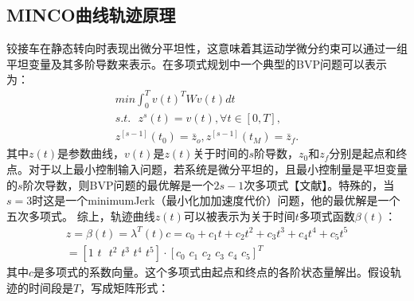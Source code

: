\documentclass[master,academic]{ysuthesis} %
\begin{document}
		\subsection{MINCO曲线轨迹原理}
		铰接车在静态转向时表现出微分平坦性，这意味着其运动学微分约束可以通过一组平坦变量及其多阶导数来表示。在多项式规划中一个典型的BVP问题可以表示为：
		\begin{equation}
			\begin{aligned}
				min\int_0^T{v}(t) ^TWv(t) dt\\
				s.t. \ \ \ z^s(t) =v(t) ,\forall t\in \left[ 0,T \right] ,\\
				z^{\left[ s-1 \right]}( t_0 ) =\bar{z}_o,z^{\left[ s-1 \right]}( t_M ) =\bar{z}_f.
			\end{aligned}
		\end{equation}
		其中$z(t)$是参数曲线，$v(t)$是$z(t)$关于时间的$s$阶导数，$z_0$和$z_f$分别是起点和终点。对于以上最小控制输入问题，若系统是微分平坦的，且最小控制量是平坦变量的$s$阶次导数，则BVP问题的最优解是一个$2s-1$次多项式【文献】。特殊的，当$s=3$时这是一个minimumJerk（最小化加加速度代价）问题，他的最优解是一个五次多项式。 
		综上，轨迹曲线$z(t)$可以被表示为关于时间$t$多项式函数$\beta(t)$：
		\begin{equation}
			\begin{aligned}
				z=\beta (t) =\lambda ^T(t) c=c_0+c_1t+c_2t^2+c_3t^3+c_4t^4+c_5t^5\\
				=\left[ 1\,\,t\,\,\,\,t^2\,\,t^3\,\,t^4\,\,t^5 \right] \cdot \left[ c_0\,\,c_1\,\,c_2\,\,c_3\,\,c_4\,\,c_5 \right] ^T
			\end{aligned}
		\end{equation}
		其中$c$是多项式的系数向量。这个多项式由起点和终点的各阶状态量解出。假设轨迹的时间段是$T$，写成矩阵形式：
\end{document}

